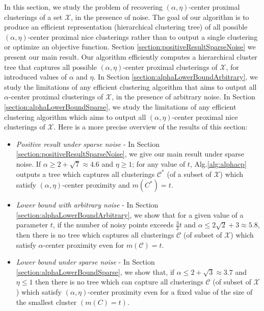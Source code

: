 \documentclass[anon,12pt]{colt2016} %
\newcommand{\mc}{\mathcal}
\begin{document}
In this section, we study the problem of recovering $(\alpha, \eta)$-center proximal clusterings of a set $\mc X$, in the presence of noise. The goal of our algorithm is to produce an efficient representation (hierarchical clustering tree) of all possible $(\alpha, \eta)$-center proximal nice clusterings rather than to output a single clustering or optimize an objective function.  Section \ref{section:positiveResultSparseNoise} we present our main result. Our algorithm efficiently computes a hierarchical cluster tree that captures all possible $(\alpha,\eta)$-center proximal clusterings of $\mc X$, for introduced values of $\alpha$ and $\eta$. In Section \ref{section:alphaLowerBoundArbitrary}, we study the limitations of any efficient clustering algorithm that aims to output all $\alpha$-center proximal clusterings of $\mc X$, in the presence of arbitrary noise. In Section \ref{section:alphaLowerBoundSparse}, we study the limitations of any efficient clustering algorithm which aims to output all $(\alpha,\eta)$-center proximal nice clusterings of $\mc X$. Here is a more precise overview of the results of this section: 


\begin{itemize}
\item  {\it Positive result under sparse noise} - In Section \ref{section:positiveResultSparseNoise}, we give our main result under sparse noise. If $\alpha \ge 2 + \sqrt{7} \approx 4.6$ and $\eta \ge 1$; for any value of $t$, Alg.\ref{alg:alphacp} outputs a tree which captures all clusterings $\mc C^*$ (of a subset of $\mc X$) which satisfy $(\alpha, \eta)$-center proximity and $m(C^*)=t$.
\item {\it Lower bound with arbitrary noise} - In Section \ref{section:alphaLowerBoundArbitrary}, we show that for a given value of a parameter $t$, if the number of noisy points exceeds $\frac{3}{2}t$ and $\alpha \le 2\sqrt{2} + 3 \approx 5.8$, then there is no tree which captures all clusterings $\mc C$ (of subset of $\mc X$) which satisfy $\alpha$-center proximity even for $m(\mc C) = t$.
\item  {\it Lower bound under sparse noise} - In Section \ref{section:alphaLowerBoundSparse}, we show that, if $\alpha \le 2 + \sqrt{3} \approx 3.7$ and $\eta \le 1$ then there is no tree which can capture all clusterings $\mc C$ (of subset of $\mc X$) which satisfy $(\alpha, \eta)$-center proximity even for a fixed value of the size of the smallest cluster $(m(C) = t)$.
\end{itemize} 
\end{document}
